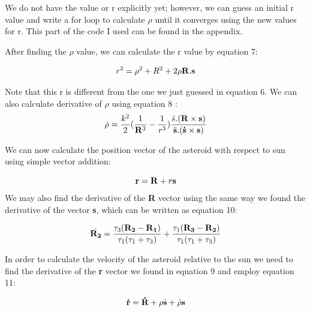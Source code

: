 \documentclass[letterpaper,12pt]{article}
\begin{document}
We do not have the value or r explicitly yet; however, we can guess an initial r value and write a for loop to calculate \begin{math} \rho \end{math} until it converges using the new values for r. This part of the code I used can be found in the appendix.


After finding the \begin{math} \rho \end{math} value, we can calculate the r value by equation 7:

\begin{equation}
r^2=\rho ^2 + R^2 + 2\rho {\bf R}. {\bf s}
\end{equation}

Note that this r is different from the one we just guessed in equation 6. 
We can also calculate derivative of \begin{math} \rho \end{math} using equation 8 :
\begin{equation}
\dot{\rho}=\frac{k^2}{2}(\frac{1}{{\bf R}^3}-\frac{1}{r^3})\frac{\ddot{s}.({\bf R}\times {\bf s})}{\ddot{{\bf s}}.({\bf \dot{s}}\times {\bf s})}
\end{equation}

We can now calculate the position vector of the asteroid with respect to sun using simple vector addition:

\begin{equation}
{\bf r}= {\bf R}+r{\bf s}
\end{equation}
We may also find the derivative of the {\bf R} vector using the same way we found the derivative of the vector {\bf s}, which can be written as equation 10:

\begin{equation}
\dot{{\bf R_{2}}}=\frac{\tau_{3}({\bf R_{2}}-{\bf R_{1}})}{\tau_{1}(\tau_{1}+\tau_{3})}+\frac{\tau_{1}({\bf R_{3}}-{\bf R_{2}})}{\tau_{1}(\tau_{1}+\tau_{3})}
\end{equation}

In order to calculate the velocity of the asteroid relative to the sun we need to find the derivative of the {\bf r} vector we found in equation 9 and employ equation 11:

\begin{equation}
{\bf \dot{r}}={\bf \dot{R}} +\rho{\dot{\bf s}} + \dot{\rho} {\bf s}
\end{equation}
\end{document}

